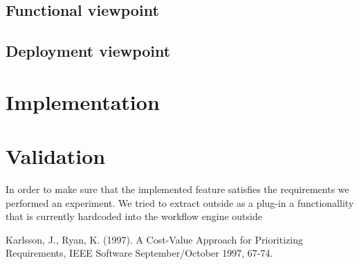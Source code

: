 \subsection{Functional viewpoint}

\subsection{Deployment viewpoint}

\section{Implementation}


\section{Validation}

In order to make sure that the implemented feature satisfies the requirements we performed an experiment. We tried to extract outside as a plug-in a functionallity that is currently hardcoded into the workflow engine outside


\begin{thebibliography}{99}

Karlsson, J., Ryan, K. (1997). A Cost-Value Approach for Prioritizing Requirements, IEEE Software September/October 1997, 67-74.


\end{thebibliography}